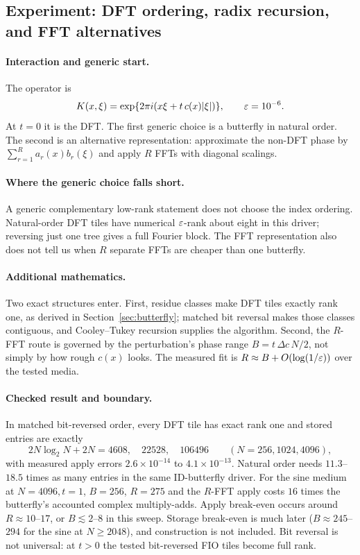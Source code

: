 \subsection{Experiment: DFT ordering, radix recursion, and FFT alternatives}
\label{exp:e2}
\paragraph{Interaction and generic start.} The operator is
\[
 K(x,\xi)=\exp\{2\pi i(x\xi+t\,c(x)|\xi|)\},\qquad \varepsilon=10^{-6}.
\]
At $t=0$ it is the DFT. The first generic choice is a butterfly in natural order. The second is an alternative representation: approximate the non-DFT phase by $\sum_{r=1}^R a_r(x)b_r(\xi)$ and apply $R$ FFTs with diagonal scalings.

\paragraph{Where the generic choice falls short.} A generic complementary low-rank statement does not choose the index ordering. Natural-order DFT tiles have numerical $\varepsilon$-rank about eight in this driver; reversing just one tree gives a full Fourier block. The FFT representation also does not tell us when $R$ separate FFTs are cheaper than one butterfly.

\paragraph{Additional mathematics.} Two exact structures enter. First, residue classes make DFT tiles exactly rank one, as derived in Section~\ref{sec:butterfly}; matched bit reversal makes those classes contiguous, and Cooley--Tukey recursion supplies the algorithm. Second, the $R$-FFT route is governed by the perturbation's phase range $B=t\,\Delta c\,N/2$, not simply by how rough $c(x)$ looks. The measured fit is $R\approx B+O(\log(1/\varepsilon))$ over the tested media.

\paragraph{Checked result and boundary.} In matched bit-reversed order, every DFT tile has exact rank one and stored entries are exactly
\[
 2N\log_2N+2N=4608,\quad22528,\quad106496
 \qquad(N=256,1024,4096),
\]
with measured apply errors $2.6\times10^{-14}$ to $4.1\times10^{-13}$. Natural order needs $11.3$--$18.5$ times as many entries in the same ID-butterfly driver. For the sine medium at $N=4096,t=1$, $B=256$, $R=275$ and the $R$-FFT apply costs $16$ times the butterfly's accounted complex multiply-adds. Apply break-even occurs around $R\approx10$--$17$, or $B\lesssim2$--$8$ in this sweep. Storage break-even is much later ($B\approx245$--$294$ for the sine at $N\ge2048$), and construction is not included. Bit reversal is not universal: at $t>0$ the tested bit-reversed FIO tiles become full rank.

